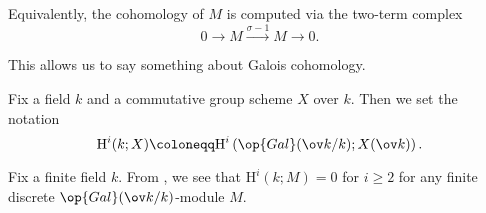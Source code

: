 \documentclass[../notes.tex]{subfiles}
\begin{document}
\begin{remark}
	Equivalently, the cohomology of $M$ is computed via the two-term complex
	\[0\to M\stackrel{\sigma-1}\to M\to 0.\]
\end{remark}
This allows us to say something about Galois cohomology.
\begin{notation}
	Fix a field $k$ and a commutative group scheme $X$ over $k$. Then we set the notation
	\[\mathrm H^i(k;X)\coloneqq\mathrm H^i\left(\op{Gal}(\ov k/k);X(\ov k)\right).\]
\end{notation}
\begin{example}
	Fix a finite field $k$. From , we see that $\mathrm H^i(k;M)=0$ for $i\ge2$ for any finite discrete $\op{Gal}(\ov k/k)$-module $M$.
\end{example}
\end{document}
